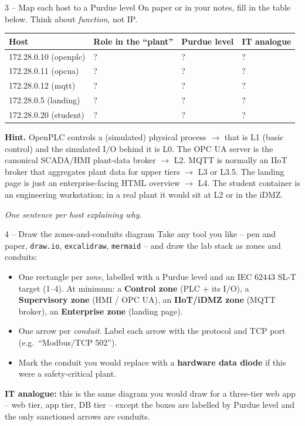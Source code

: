 \documentclass[11pt,a4paper]{article}
\begin{document}
\begin{stepbox}{3 -- Map each host to a Purdue level}
On paper or in your notes, fill in the table below. Think about
\emph{function}, not IP.

\begin{center}
\renewcommand{\arraystretch}{1.25}
\begin{tabular}{|l|l|l|l|}
\hline
\textbf{Host} & \textbf{Role in the ``plant''} & \textbf{Purdue level} & \textbf{IT analogue} \\
\hline
172.28.0.10 (openplc)  & ?  & ?  & ? \\
172.28.0.11 (opcua)    & ?  & ?  & ? \\
172.28.0.12 (mqtt)     & ?  & ?  & ? \\
172.28.0.5  (landing)  & ?  & ?  & ? \\
172.28.0.20 (student)  & ?  & ?  & ? \\
\hline
\end{tabular}
\end{center}

\textbf{Hint.} OpenPLC controls a (simulated) physical process $\rightarrow$
that is L1 (basic control) and the simulated I/O behind it is L0. The OPC
UA server is the canonical SCADA/HMI plant-data broker $\rightarrow$ L2.
MQTT is normally an IIoT broker that aggregates plant data for upper tiers
$\rightarrow$ L3 or L3.5. The landing page is just an enterprise-facing
HTML overview $\rightarrow$ L4. The student container is an engineering
workstation; in a real plant it would sit at L2 or in the iDMZ.

\emph{One sentence per host explaining why.}
\end{stepbox}

\begin{stepbox}{4 -- Draw the zones-and-conduits diagram}
Take any tool you like -- pen and paper, \texttt{draw.io},
\texttt{excalidraw}, \texttt{mermaid} -- and draw the lab stack as zones
and conduits:

\begin{itemize}\setlength{\itemsep}{2pt}
  \item One rectangle per \emph{zone}, labelled with a Purdue level and an
        IEC 62443 SL-T target (1--4). At minimum: a \textbf{Control zone}
        (PLC + its I/O), a \textbf{Supervisory zone} (HMI / OPC UA), an
        \textbf{IIoT/iDMZ zone} (MQTT broker), an \textbf{Enterprise
        zone} (landing page).
  \item One arrow per \emph{conduit}. Label each arrow with the protocol
        and TCP port (e.g.\ ``Modbus/TCP 502'').
  \item Mark the conduit you would replace with a \textbf{hardware data
        diode} if this were a safety-critical plant.
\end{itemize}

\textbf{IT analogue:} this is the same diagram you would draw for a
three-tier web app -- web tier, app tier, DB tier -- except the boxes are
labelled by Purdue level and the only sanctioned arrows are conduits.
\end{stepbox}
\end{document}
